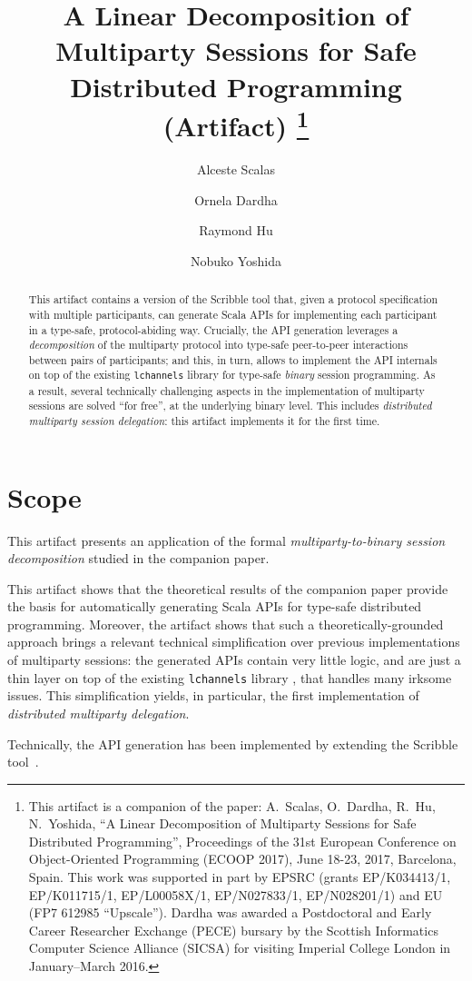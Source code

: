 \documentclass[a4paper,UKenglish]{darts}
\title{A Linear Decomposition of Multiparty Sessions for Safe Distributed Programming (Artifact)%
  \footnote{This artifact is a companion of the paper: %
  A.~Scalas, O.~Dardha, R.~Hu, N.~Yoshida, ``A Linear Decomposition of Multiparty Sessions for Safe Distributed Programming'', %
  Proceedings of the 31st European Conference on Object-Oriented Programming (ECOOP 2017), June 18-23, 2017, Barcelona, Spain. %
  This  work was supported in part by %
  EPSRC (grants EP/K034413/1,
  EP/K011715/1, EP/L00058X/1, EP/N027833/1, EP/N028201/1) and %
  EU (FP7 612985 ``Upscale''). %
  Dardha %
  was awarded a %
  Postdoctoral and Early Career Researcher Exchange (PECE) bursary %
  by the Scottish Informatics Computer Science Alliance (SICSA) %
  for visiting Imperial College London in January--March 2016.
}}
\author[1]{Alceste Scalas}%
\author[2]{Ornela Dardha}%
\author[3]{Raymond Hu}%
\author[4]{Nobuko Yoshida}%
\affil[1]{Imperial College London, UK\\
  \texttt{alceste.scalas@imperial.ac.uk}
}%
\affil[2]{University of Glasgow, UK\\
  \texttt{ornela.dardha@glasgow.ac.uk}%
}%
\affil[3]{Imperial College London, UK\\
  \texttt{raymond.hu@imperial.ac.uk}%
}%
\affil[4]{Imperial College London, UK\\
  \texttt{n.yoshida@imperial.ac.uk}
}%
\newenvironment{scope}{\section{Scope}}{}
\begin{document}
\maketitle

\begin{abstract}
  This artifact contains a version of the Scribble tool %
  that, given a protocol specification with multiple participants, %
  can generate Scala APIs %
  for implementing each participant in a type-safe, protocol-abiding way.
  Crucially, the API generation leverages a \emph{decomposition} %
  of the multiparty protocol into type-safe peer-to-peer interactions %
  between pairs of participants; %
  and this, in turn, %
  allows to implement the API internals %
  on top of the existing \texttt{lchannels} library %
  for type-safe \emph{binary} session programming. %
  As a result, %
  several technically challenging aspects %
  in the implementation of multiparty sessions %
  are solved ``for free'', at the underlying binary level. %
  This includes \emph{distributed multiparty session delegation}: %
  this artifact implements it for the first time. %
\end{abstract}


\begin{scope}
  This artifact presents an application %
  of the formal \emph{multiparty-to-binary session decomposition} %
  studied in the companion paper. %

  This artifact shows that %
  the theoretical results of the companion paper %
  provide the basis %
  for automatically generating Scala APIs %
  for type-safe distributed programming. %
  Moreover, the artifact shows that %
  such a theoretically-grounded approach %
  brings a relevant technical simplification %
  over previous implementations of multiparty sessions: %
  the generated APIs contain very little logic, %
  and are just a thin layer %
  on top of the existing \texttt{lchannels} library %
  \cite{ScalasY16,ScalasY16Artifact}, %
  that handles many irksome issues. %
  This simplification yields, in particular, %
  the first implementation of \emph{distributed multiparty delegation}.

  Technically, the API generation has been implemented by extending %
  the Scribble tool~\cite{HY16}.
\end{scope}
\end{document}
